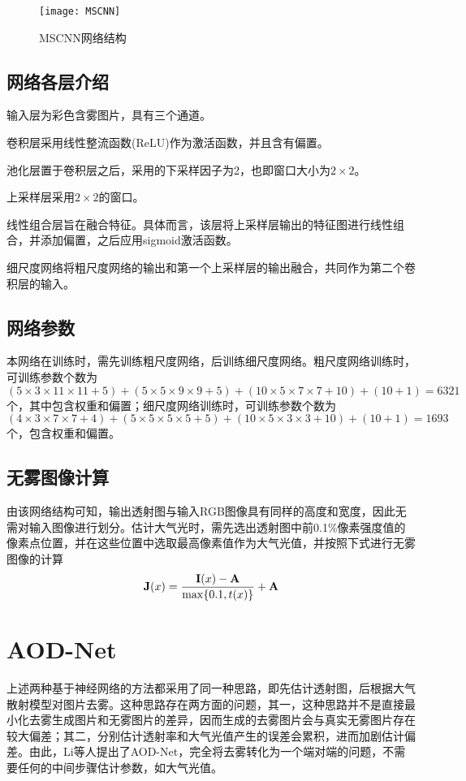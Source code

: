 \documentclass[a4paper, 12pt, oneside]{report}
\begin{document}
{\begin{figure}[H]
\centering
\texttt{[image: MSCNN]}
\caption{MSCNN网络结构}
\label{fig:3.8}
\end{figure}

\subsection{网络各层介绍\quad}
	输入层为彩色含雾图片，具有三个通道。
\par 卷积层采用线性整流函数(ReLU)作为激活函数，并且含有偏置。
\par 池化层置于卷积层之后，采用的下采样因子为2，也即窗口大小为$2 \times 2$。
\par 上采样层采用$2 \times 2$的窗口。
\par 线性组合层旨在融合特征。具体而言，该层将上采样层输出的特征图进行线性组合，并添加偏置，之后应用sigmoid激活函数。
\par 细尺度网络将粗尺度网络的输出和第一个上采样层的输出融合，共同作为第二个卷积层的输入。

\subsection{网络参数\quad}
	本网络在训练时，需先训练粗尺度网络，后训练细尺度网络。粗尺度网络训练时，可训练参数个数为$(5 \times 3 \times 11 \times 11 + 5) + (5 \times 5 \times 9 \times 9 + 5) + (10 \times 5 \times 7 \times 7 + 10) + (10 + 1) = 6321$个，其中包含权重和偏置；细尺度网络训练时，可训练参数个数为$(4 \times 3 \times 7 \times 7 + 4) + (5 \times 5 \times 5 \times 5 + 5) + (10 \times 5 \times 3 \times 3 + 10) + (10 + 1) = 1693$个，包含权重和偏置。

\subsection{无雾图像计算\quad}
由该网络结构可知，输出透射图与输入RGB图像具有同样的高度和宽度，因此无需对输入图像进行划分。估计大气光时，需先选出透射图中前0.1\%像素强度值的像素点位置，并在这些位置中选取最高像素值作为大气光值，并按照下式进行无雾图像的计算
\begin{equation} \label{eq:3.5}
{\bf J}(x) = \frac{{\bf I}(x) - {\bf A}}{\max\{0.1, t(x)\}} + {\bf A}
\end{equation}

\section{AOD-Net\quad}
上述两种基于神经网络的方法都采用了同一种思路，即先估计透射图，后根据大气散射模型对图片去雾。这种思路存在两方面的问题，其一，这种思路并不是直接最小化去雾生成图片和无雾图片的差异，因而生成的去雾图片会与真实无雾图片存在较大偏差；其二，分别估计透射率和大气光值产生的误差会累积，进而加剧估计偏差。由此，Li\cite{ref18}等人提出了AOD-Net，完全将去雾转化为一个端对端的问题，不需要任何的中间步骤估计参数，如大气光值。

}
\end{document}
